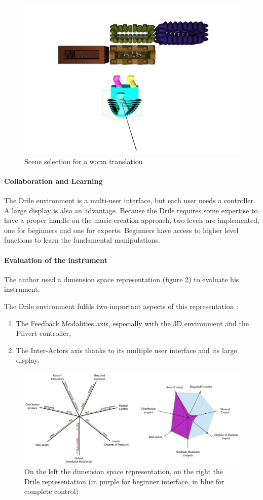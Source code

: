 \begin{figure}[h!]
\centering\includegraphics[scale=0.55]{image/scenes.JPG}
\caption{Scene selection for a worm translation}
\label{fig:scene}
\end{figure} 

\paragraph{Collaboration and Learning}
The Drile environment is a multi-user interface, but each user needs a controller. A large display is also an advantage. Because the Drile requires some expertise to have a proper handle on the music creation approach, two levels are implemented, one for beginners and one for experts. Beginners have access to higher level functions to learn the fundamental manipulations.

\paragraph{Evaluation of the instrument}
The author used a dimension space representation (figure \ref{fig:classinstr}) to evaluate his instrument\cite{birnbaum2005towards}. 

The Drile environment fulfils two important aspects of this representation : 
\begin{enumerate}
\item The Feedback Modalities axis, especially with the 3D environment and the Piivert controller, 
\item The Inter-Actors axis thanks to its multiple user interface and its large display.
\end{enumerate}

\begin{figure}[h!]
\centering\includegraphics[scale=0.7]{image/classification_new_instr.jpg}
\caption{On the left the dimension space representation,
on the right the Drile representation (in purple for beginner interface, in blue for complete control)}
\label{fig:classinstr}
\end{figure} 


